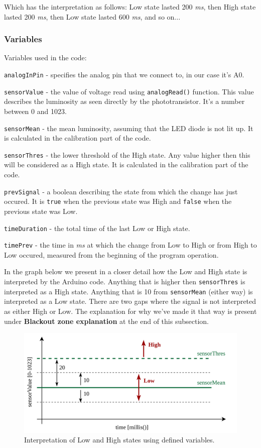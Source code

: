 \documentclass[10pt]{report}
\begin{document}
Which has the interpretation as follows: Low state lasted 200 \textit{ms}, then High state lasted 200 \textit{ms}, then Low state lasted 600 \textit{ms}, and so on...




\subsubsection{Variables}

Variables used in the code:

\verb|analogInPin| - specifies the analog pin that we connect to, in our case it's A0.

\verb|sensorValue| - the value of voltage read using \verb|analogRead()| function. This value describes the luminosity as seen directly by the phototransistor. It's a number between 0 and 1023.

\verb|sensorMean| - the mean luminosity, assuming that the LED diode is not lit up. It is calculated in the calibration part of the code.

\verb|sensorThres| - the lower threshold of the High state. Any value higher then this will be considered as a High state. It is calculated in the calibration part of the code.

\verb|prevSignal| - a boolean describing the state from which the change has just occured. It is \verb|true| when the previous state was High and \verb|false| when the previous state was Low.

\verb|timeDuration| - the total time of the last Low or High state.

\verb|timePrev| - the time in \textit{ms} at which the change from Low to High or from High to Low occured, measured from the beginning of the program operation.

In the graph below we present in a closer detail how the Low and High state is interpreted by the Arduino code. Anything that is higher then \verb|sensorThres| is interpreted as a High state. Anything that is 10 from \verb|sensorMean| (either way) is interpreted as a Low state. There are two gaps where the signal is not interpreted as either High or Low. The explanation for why we've made it that way is present under \textbf{Blackout zone explanation} at the end of this subsection.

\begin{figure}[H]
\centering\includegraphics[width=14.5cm]{arduinocode}
\caption{Interpretation of Low and High states using defined variables.}				
\label{fig:arduino_code}
\end{figure}
\end{document}
